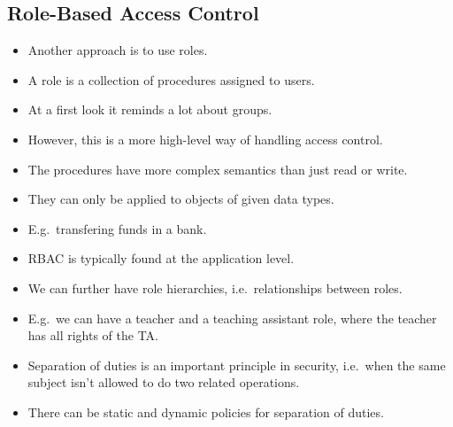 \documentclass{beamer}
\begin{document}
\subsection{Role-Based Access Control}

\begin{frame}{\insertsubsectionhead}
  \begin{itemize}
    \item Another approach is to use roles.

    \item A role is a collection of procedures assigned to users.

    \item At a first look it reminds a lot about groups.

    \item However, this is a more high-level way of handling access control.

  \end{itemize}
\end{frame}

\begin{frame}{\insertsubsectionhead}
  \begin{itemize}
    \item The procedures have more complex semantics than just read or write.

    \item They can only be applied to objects of given data types.

    \item E.g.\ transfering funds in a bank.

    \item RBAC is typically found at the application level.
  \end{itemize}
\end{frame}

\begin{frame}{\insertsubsectionhead}
  \begin{itemize}
    \item We can further have role hierarchies, i.e.\ relationships between 
      roles.

    \item E.g.\ we can have a teacher and a teaching assistant role, where the 
      teacher has all rights of the TA\@.

    \item Separation of duties is an important principle in security, i.e.\ 
      when the same subject isn't allowed to do two related operations.

    \item There can be static and dynamic policies for separation of duties.

  \end{itemize}
\end{frame}
\end{document}
